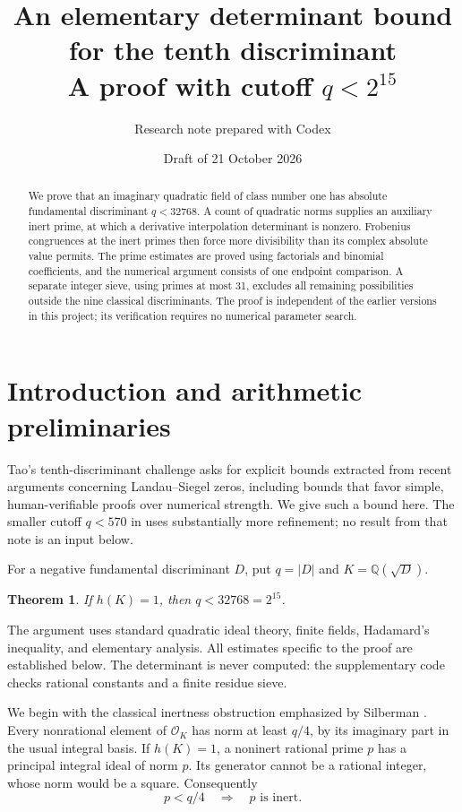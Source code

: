 \documentclass[11pt]{article}
\title{An elementary determinant bound\\for the tenth discriminant\\
\large A proof with cutoff \(q<2^{15}\)}
\author{Research note prepared with Codex}
\date{Draft of 21 October 2026}
\newtheorem{theorem}{Theorem}
\newcommand{\Q}{\mathbb Q}
\newcommand{\OK}{\mathcal O_K}
\begin{document}
\maketitle

\begin{abstract}
We prove that an imaginary quadratic field of class number one has
absolute fundamental discriminant \(q<32768\). A count of quadratic
norms supplies an auxiliary inert prime, at which a derivative
interpolation determinant is nonzero. Frobenius congruences at the
inert primes then force more divisibility than its complex absolute
value permits. The prime estimates are proved using factorials and
binomial coefficients, and the numerical argument consists of one
endpoint comparison. A separate integer sieve, using primes at most
31, excludes all remaining possibilities outside the nine classical
discriminants. The proof is independent of the earlier versions in
this project; its verification requires no numerical parameter search.
\end{abstract}

\section{Introduction and arithmetic preliminaries}

Tao's tenth-discriminant challenge \cite{tao} asks for explicit bounds
extracted from recent arguments concerning Landau--Siegel zeros,
including bounds that favor simple, human-verifiable proofs over
numerical strength. We give such a bound here. The smaller cutoff
\(q<570\) in \cite{v6} uses substantially more refinement; no result
from that note is an input below.

For a negative fundamental discriminant \(D\), put \(q=|D|\) and
\(K=\Q(\sqrt D)\).
\begin{theorem}\label{main}
If \(h(K)=1\), then \(q<32768=2^{15}\).
\end{theorem}

The argument uses standard quadratic ideal theory, finite fields,
Hadamard's inequality, and elementary analysis. All estimates specific
to the proof are established below. The determinant is never computed:
the supplementary code checks rational constants and a finite residue
sieve.

We begin with the classical inertness obstruction emphasized by
Silberman \cite{silberman}. Every nonrational element of \(\OK\) has
norm at least \(q/4\), by its imaginary part in the usual integral
basis. If \(h(K)=1\), a noninert rational prime \(p\) has a principal
integral ideal of norm \(p\). Its generator cannot be a rational
integer, whose norm would be a square. Consequently
\begin{equation}\label{small-inert}
 p<q/4\quad\Longrightarrow\quad p\text{ is inert}.
\end{equation}
\end{document}
